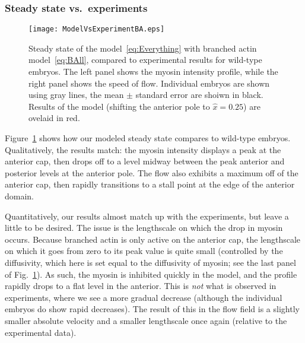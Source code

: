 \documentclass[11pt]{article}
\newcommand{\red}[1]{\color{red}#1\normalcolor}
\newcommand{\6}[1]{#1_{\text{6}}}
\newcommand{\3}[1]{#1_{\text{3}}}
\begin{document}
\subsubsection{Steady state vs.\ experiments}

\begin{figure}
\centering
\texttt{[image: ModelVsExperimentBA.eps]}
\caption{\label{fig:StStBA}Steady state of the model\ \eqref{eq:Everything} with branched actin model\ \eqref{eq:BAll}, compared to experimental results for wild-type embryos. The left panel shows the myosin intensity profile, while the right panel shows the speed of flow. Individual embryos are shown using gray lines, the mean $\pm$ standard error are shoiwn in black. Results of the model (shifting the anterior pole to $\hat x = 0.25$) are ovelaid in red.}
\end{figure}

Figure\ \ref{fig:StStBA} shows how our modeled steady state compares to wild-type embryos. Qualitatively, the results match: the myosin intensity displays a peak at the anterior cap, then drops off to a level midway between the peak anterior and posterior levels at the anterior pole. The flow also exhibits a maximum off of the anterior cap, then rapidly transitions to a stall point at the edge of the anterior domain.

\red{Quantitatively, our results almost match up with the experiments, but leave a little to be desired. The issue is the lengthscale on which the drop in myosin occurs. Because branched actin is only active on the anterior cap, the lengthscale on which it goes from zero to its peak value is quite small (controlled by the diffusivity, which here is set equal to the diffusivity of myosin; see the last panel of Fig.\ \ref{fig:StStBA}). As such, the myosin is inhibited quickly in the model, and the profile rapidly drops to a flat level in the anterior. This is \emph{not} what is observed in experiments, where we see a more gradual decrease (although the individual embryos do show rapid decreases). The result of this in the flow field is a slightly smaller absolute velocity and a smaller lengthscale once again (relative to the experimental data).}
\fi




\end{document}

